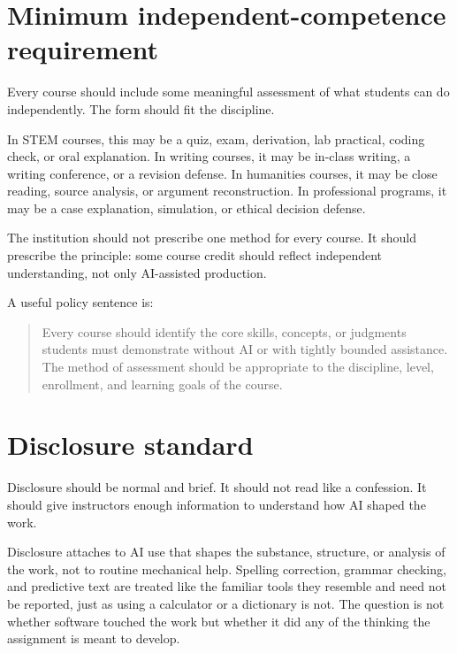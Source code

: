 \documentclass{SIAMbook2023}
\begin{document}
\section{Minimum independent-competence requirement}
\label{u:sec:min-competence}%

Every course should include some meaningful assessment of what students can do independently. The form should fit the discipline.

In STEM courses, this may be a quiz, exam, derivation, lab practical, coding check, or oral explanation. In writing courses, it may be in-class writing, a writing conference, or a revision defense. In humanities courses, it may be close reading, source analysis, or argument reconstruction. In professional programs, it may be a case explanation, simulation, or ethical decision defense.

The institution should not prescribe one method for every course. It should prescribe the principle: some course credit should reflect independent understanding, not only AI-assisted production.

A useful policy sentence is:

\begin{quote}
Every course should identify the core skills, concepts, or judgments students must demonstrate without AI or with tightly bounded assistance. The method of assessment should be appropriate to the discipline, level, enrollment, and learning goals of the course.
\end{quote}

\section{Disclosure standard}
\label{u:sec:disclosure}%

Disclosure should be normal and brief. It should not read like a confession. It should give instructors enough information to understand how AI shaped the work.

Disclosure attaches to AI use that shapes the substance, structure, or analysis of the work, not to routine mechanical help. Spelling correction, grammar checking, and predictive text are treated like the familiar tools they resemble and need not be reported, just as using a calculator or a dictionary is not. The question is not whether software touched the work but whether it did any of the thinking the assignment is meant to develop.
\end{document}
